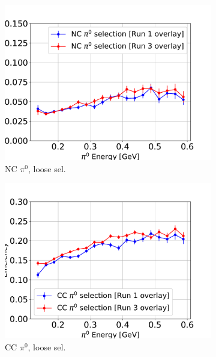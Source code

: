 \documentclass[a4paper]{article}
\begin{document}
\begin{figure}[H] 
\begin{center}
    \begin{subfigure}[b]{0.4\textwidth}
    \centering
    \includegraphics[width=1.00\textwidth]{stability/pi0_e_03112020_eff_NC.pdf}
    \caption{\label{fig:stability:pi0eff:NC} NC $\pi^0$, loose sel.}
    \end{subfigure}
    \begin{subfigure}[b]{0.4\textwidth}
    \centering
    \includegraphics[width=1.00\textwidth]{stability/pi0_e_03112020_eff_CC.pdf}
    \caption{\label{fig:stability:pi0eff:CCtight} CC $\pi^0$, loose sel.}
    \end{subfigure}
    \begin{subfigure}[b]{0.4\textwidth}

\end{subfigure}
\end{center}
\end{figure}
\end{document}

